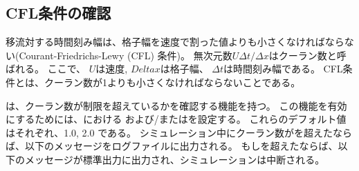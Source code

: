 \subsection{CFL条件の確認} \label{subsec:cfl_check}

移流対する時間刻み幅は、格子幅を速度で割った値よりも小さくなければならない(Courant-Friedrichs-Lewy (CFL) 条件)。
無次元数$U \Delta t/\Delta x$はクーラン数と呼ばれる。
ここで、 $U$は速度, $Delta x$は格子幅、 $\Delta t$は時間刻み幅である。
CFL条件とは、クーラン数が1よりも小さくなければならないことである。

\scalerm は、クーラン数が制限を超えているかを確認する機能を持つ。
この機能を有効にするためには、における および/またはを設定する。
これらのデフォルト値はそれぞれ、1.0, 2.0 である。
シミュレーション中にクーラン数がを超えたならば、以下のメッセージをログファイルに出力される。
もしを超えたならば、以下のメッセージが標準出力に出力され、シミュレーションは中断される。
